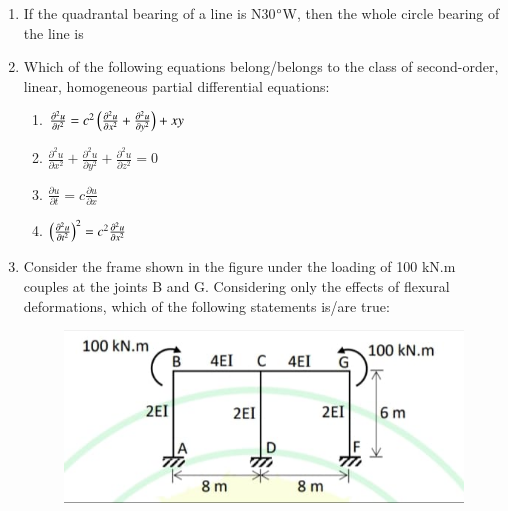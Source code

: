 \documentclass[journal,12pt,onecolumn]{article}
\theoremstyle{remark}
\begin{document}
\begin{enumerate}
\item If the quadrantal bearing of a line is N30$\degree$W, then the whole circle bearing of the line is

\hfill{}
\begin{enumerate}
\end{enumerate}

\item Which of the following equations belong/belongs to the class of second-order, linear, homogeneous partial differential equations:

\hfill{}
\begin{enumerate}
    \item $\frac{\partial^2 u}{\partial t^2} = c^2 \left(\frac{\partial^2 u}{\partial x^2} + \frac{\partial^2 u}{\partial y^2}\right) + xy$
    \item $\frac{\partial^2 u}{\partial x^2} + \frac{\partial^2 u}{\partial y^2} + \frac{\partial^2 u}{\partial z^2} = 0$
    \item $\frac{\partial u}{\partial t} = c \frac{\partial u}{\partial x}$
    \item $\left(\frac{\partial^2 u}{\partial t^2}\right)^2 = c^2 \frac{\partial^2 u}{\partial x^2}$
\end{enumerate}

\item Consider the frame shown in the figure  under the loading of 100 kN.m couples at the joints B and G. Considering only the effects of flexural deformations, which of the following statements is/are true:
\begin{figure}[H]
    \centering
    \includegraphics[width=0.7\columnwidth]{figs/1q-29.jpg}
    \caption{}
    \label{fig:q29}
\end{figure}


\end{enumerate}
\end{document}
